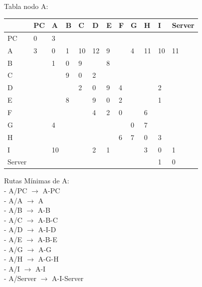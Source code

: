 \documentclass[a4paper]{article}
\begin{document}
\begin{table}[ht]
Tabla nodo A:\\
\begin{tabular}{|l|l|l|l|l|l|l|l|l|l|l|l|}
\hline
       & PC & A  & B & C  & D  & E & F & G & H  & I  & Server \\ \hline
PC     & 0  & 3  &   &    &    &   &   &   &    &    &        \\ \hline
A      & 3  & 0  & 1 & 10 & 12 & 9 &   & 4 & 11 & 10 & 11     \\ \hline
B      &    & 1  & 0 & 9  &    & 8 &   &   &    &    &        \\ \hline
C      &    &    & 9 & 0  & 2  &   &   &   &    &    &        \\ \hline
D      &    &    &   & 2  & 0  & 9 & 4 &   &    & 2  &        \\ \hline
E      &    &    & 8 &    & 9  & 0 & 2 &   &    & 1  &        \\ \hline
F      &    &    &   &    & 4  & 2 & 0 &   & 6  &    &        \\ \hline
G      &    & 4  &   &    &    &   &   & 0 & 7  &    &        \\ \hline
H      &    &    &   &    &    &   & 6 & 7 & 0  & 3  &        \\ \hline
I      &    & 10 &   &    & 2  & 1 &   &   & 3  & 0  & 1      \\ \hline
Server &    &    &   &    &    &   &   &   &    & 1  & 0      \\ \hline
\end{tabular}

Rutas Mínimas de A:\\
-	A/PC  $\rightarrow$  A-PC\\
-	A/A  $\rightarrow$  A\\
-	A/B  $\rightarrow$  A-B\\
-	A/C  $\rightarrow$  A-B-C\\
-	A/D  $\rightarrow$  A-I-D\\
-	A/E  $\rightarrow$  A-B-E\\
-	A/G  $\rightarrow$  A-G\\
-	A/H  $\rightarrow$  A-G-H\\
-	A/I  $\rightarrow$  A-I\\
-	A/Server  $\rightarrow$  A-I-Server\\

\end{table}



\clearpage
\end{document}
